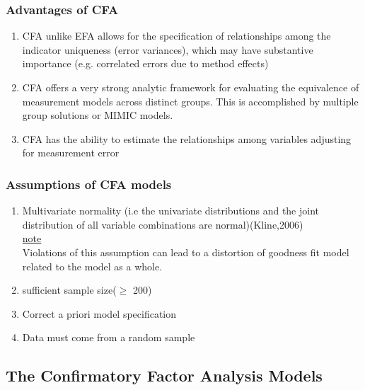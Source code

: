 \documentclass[12pt]{article}
\begin{document}
\subsubsection{Advantages of CFA}
\begin{enumerate}
	\item CFA unlike EFA allows for the specification of relationships among the indicator uniqueness (error variances), which may have substantive importance (e.g. correlated errors due to method effects)
	\item CFA offers a very strong analytic framework for evaluating the equivalence of measurement models across distinct groups. This is accomplished by multiple group solutions or MIMIC models.
	\item CFA has the ability to estimate the relationships among variables adjusting for measurement error
\end{enumerate}

\subsubsection{Assumptions of CFA models}
\begin{enumerate}
	\item Multivariate normality (i.e the univariate distributions and the joint distribution of all variable combinations are normal)(Kline,2006)\\
	\underline{note}\\
	Violations of this assumption can lead to a distortion of goodness fit model related to the model as a whole.
	\item sufficient sample size($\geq$ 200)
	\item Correct a priori model specification
	\item Data must come from a random sample
\end{enumerate}
\subsection{The Confirmatory Factor Analysis Models}
\end{document}
